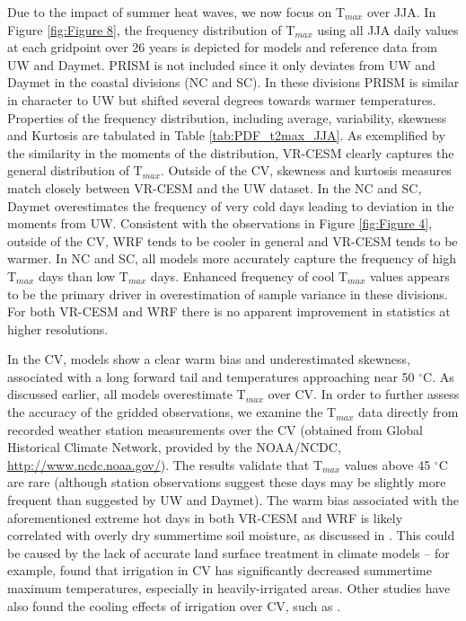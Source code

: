 \documentclass[draft,ms]{agutex}   %
\begin{document}
\begin{article}
Due to the impact of summer heat waves, we now focus on T$_{max}$ over JJA. In Figure \ref{fig:Figure 8}, the frequency distribution of T$_{max}$ using all JJA daily values at each gridpoint over 26 years is depicted for models and reference data from UW and Daymet. PRISM is not included since it only deviates from UW and Daymet in the coastal divisions (NC and SC).  In these divisions PRISM is similar in character to UW but shifted several degrees towards warmer temperatures. Properties of the frequency distribution, including average, variability, skewness and Kurtosis are tabulated in Table \ref{tab:PDF_t2max_JJA}.  As exemplified by the similarity in the moments of the distribution, VR-CESM clearly captures the general distribution of T$_{max}$. Outside of the CV, skewness and kurtosis measures match closely between VR-CESM and the UW dataset. In the NC and SC, Daymet overestimates the frequency of very cold days leading to deviation in the moments from UW.  Consistent with the observations in Figure \ref{fig:Figure 4}, outside of the CV, WRF tends to be cooler in general and VR-CESM tends to be warmer.  In NC and SC, all models more accurately capture the frequency of high T$_{max}$ days than low T$_{max}$ days. Enhanced frequency of cool T$_{max}$ values appears to be the primary driver in overestimation of sample variance in these divisions. For both VR-CESM and WRF there is no apparent improvement in statistics at higher resolutions.

In the CV, models show a clear warm bias and underestimated skewness, associated with a long forward tail and temperatures approaching near 50 $^\circ$C. As discussed earlier, all models overestimate T$_{max}$ over CV. In order to further assess the accuracy of the gridded observations, we examine the T$_{max}$ data directly from recorded weather station measurements over the CV (obtained from Global Historical Climate Network, provided by the NOAA/NCDC, \url{http://www.ncdc.noaa.gov/}). The results validate that T$_{max}$ values above 45 $^\circ$C are rare (although station observations suggest these days may be slightly more frequent than suggested by UW and Daymet). The warm bias associated with the aforementioned extreme hot days in both VR-CESM and WRF is likely correlated with overly dry summertime soil moisture, as discussed in \cite{caldwell2009evaluation}. This could be caused by the lack of accurate land surface treatment in climate models -- for example, \cite{bonfils2007empirical} found that irrigation in CV has significantly decreased summertime maximum temperatures, especially in heavily-irrigated areas. Other studies have also found the cooling effects of irrigation over CV, such as \cite{kueppers2007irrigation}.



\end{article}
\end{document}
